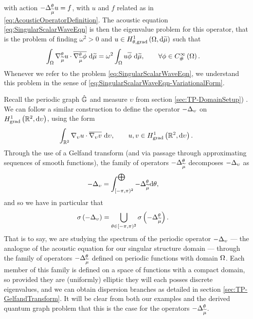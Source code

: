 with action $-\Delta_{\widetilde{\mu}}^{\theta} u = f$, with $u$ and $f$ related as in \eqref{eq:AcousticOperatorDefinition}.
The acoustic equation \eqref{eq:SingularScalarWaveEqn} is then the eigenvalue problem for this operator, that is the problem of finding $\omega^2>0$ and $u\in H^1_{\theta, \mathrm{grad}}\left( \Omega, \mathrm{d}\widetilde{\mu} \right)$ such that
\begin{align} \label{eq:SingularScalarWaveEqn-VariationalForm}
	\int_{\Omega} \nabla^{\theta}_{\widetilde{\mu}}u\cdot\overline{\nabla^{\theta}_{\widetilde{\mu}}\phi}  \ \mathrm{d}\widetilde{\mu}
	&= \omega^2 \int_{\Omega} u\overline{\phi}  \ \mathrm{d}\widetilde{\mu},
	\qquad\forall\phi\in C^{\infty}_{\#}\left( \Omega \right).
\end{align}
Whenever we refer to the problem \eqref{eq:SingularScalarWaveEqn}, we understand this problem in the sense of \eqref{eq:SingularScalarWaveEqn-VariationalForm}.

Recall the periodic graph $\hat{\mathbb{G}}$ and measure $\upsilon$ from section \ref{sec:TP-DomainSetup}) .
We can follow a similar construction to define the operator $-\Delta_{\upsilon}$ on $H^1_\mathrm{grad}\left( \mathbb{R}^2, \mathrm{d}\upsilon \right)$, using the form
\begin{align*}
	\int_{\mathbb{R}^2} \nabla_{\upsilon}u\cdot\overline{\nabla_{\upsilon}v}  \ \mathrm{d}\upsilon,
	\qquad u,v\in H^1_\mathrm{grad}\left( \mathbb{R}^2, \mathrm{d}\upsilon \right).
\end{align*}
Through the use of a Gelfand transform (and via passage through approximating sequences of smooth functions), the family of operators $-\Delta_{\widetilde{\mu}}^{\theta}$ decomposes $-\Delta_{\upsilon}$ as
\begin{align*}
	-\Delta_{\upsilon} &= \int_{[-\pi,\pi)^2}^{\bigoplus} -\Delta_{\widetilde{\mu}}^{\theta} \mathrm{d}\theta,
\end{align*}
and so we have in particular that
\begin{align*}
	\sigma\left(  -\Delta_{\upsilon}  \right) &= \bigcup_{\theta\in[-\pi,\pi)^2} \sigma\left(  -\Delta_{\widetilde{\mu}}^{\theta}  \right).
\end{align*}
That is to say, we are studying the spectrum of the periodic operator $-\Delta_{\upsilon}$ --- the analogue of the acoustic equation for our singular structure domain --- through the family of operators $-\Delta_{\widetilde{\mu}}^{\theta}$ defined on periodic functions with domain $\Omega$.
Each member of this family is defined on a space of functions with a compact domain, so provided they are (uniformly) elliptic they will each posses discrete eigenvalues, and we can obtain dispersion branches as detailed in section \ref{sec:TP-GelfandTransform}.
It will be clear from both our examples and the derived quantum graph problem that this is the case for the operators $-\Delta_{\widetilde{\mu}}^{\theta}$.

